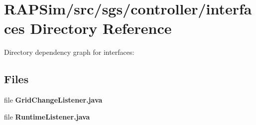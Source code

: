 \section{R\-A\-P\-Sim/src/sgs/controller/interfaces Directory Reference}
\label{dir_0570df259d320e063bb24d5ea492d463}
Directory dependency graph for interfaces\-:
\subsection*{Files}
\begin{DoxyCompactItemize}
\item 
file {\bf Grid\-Change\-Listener.\-java}
\item 
file {\bf Runtime\-Listener.\-java}
\end{DoxyCompactItemize}
